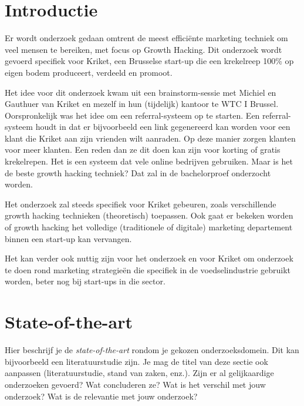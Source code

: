 
\section{Introductie} %
\label{sec:introductie}

Er wordt onderzoek gedaan omtrent de meest efficiënte marketing techniek om veel mensen te bereiken, met focus op Growth Hacking. Dit onderzoek wordt gevoerd specifiek voor Kriket, een Brusselse start-up die een krekelreep 100\% op eigen bodem produceert, verdeeld en promoot.

Het idee voor dit onderzoek kwam uit een brainstorm-sessie met Michiel en Gauthuer van Kriket en mezelf in hun (tijdelijk) kantoor te WTC I Brussel. Oorspronkelijk was het idee om een referral-systeem op te starten. 
Een referral-systeem houdt in dat er bijvoorbeeld een link gegenereerd kan worden voor een klant die Kriket aan zijn vrienden wilt aanraden. Op deze manier zorgen klanten voor meer klanten. Een reden dan ze dit doen kan zijn voor korting of gratis krekelrepen. Het is een systeem dat vele online bedrijven gebruiken. Maar is het de beste growth hacking techniek? Dat zal in de bachelorproef onderzocht worden.

Het onderzoek zal steeds specifiek voor Kriket gebeuren, zoals verschillende growth hacking technieken (theoretisch) toepassen. Ook gaat er bekeken worden of growth hacking het volledige (traditionele of digitale) marketing departement binnen een start-up kan vervangen.

Het kan verder ook nuttig zijn voor het onderzoek en voor Kriket om onderzoek te doen rond marketing strategieën die specifiek in de voedselindustrie gebruikt worden, beter nog bij start-ups in die sector.


\section{State-of-the-art}
\label{sec:state-of-the-art}

Hier beschrijf je de \emph{state-of-the-art} rondom je gekozen onderzoeksdomein. Dit kan bijvoorbeeld een literatuurstudie zijn. Je mag de titel van deze sectie ook aanpassen (literatuurstudie, stand van zaken, enz.). Zijn er al gelijkaardige onderzoeken gevoerd? Wat concluderen ze? Wat is het verschil met jouw onderzoek? Wat is de relevantie met jouw onderzoek?


